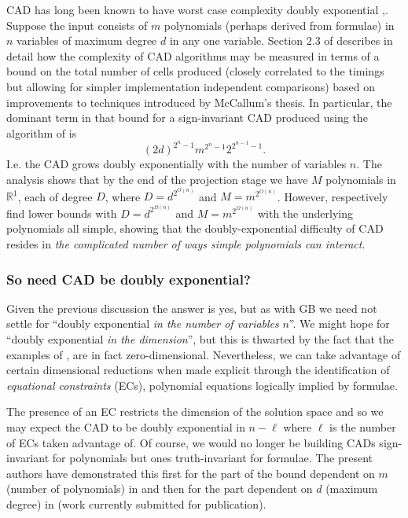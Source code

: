 \documentclass{llncs}
\begin{document}
CAD has long been known to have worst case complexity doubly exponential \cite{BD07},\cite{DH88}. Suppose the input consists of $m$ polynomials (perhaps derived from formulae) in $n$ variables of maximum degree $d$ in any one variable.  Section 2.3 of \cite{BDEMW16} describes in detail how the complexity of CAD algorithms may be measured in terms of a bound on the total number of cells produced (closely correlated to the timings but allowing for simpler implementation independent comparisons) based on improvements to techniques introduced by McCallum's thesis.  In particular, the dominant term in that bound for a sign-invariant CAD produced using the algorithm of \cite{McCallum1998} is
\begin{equation}
\label{eq:BoundSI}
(2d)^{2^{n}-1}m^{2^{n}-1}2^{2^{n-1}-1}.
\end{equation}
I.e. the CAD grows doubly exponentially with the number of variables $n$.
The analysis shows that by the end of the projection stage we have $M$ polynomials in $\mathbb{R}^1$, each of degree $D$, where $D=d^{2^{O(n)}}$ and $M=m^{2^{O(n)}}$. 
However, \cite{DH88} \cite{BD07} respectively find lower bounds with $D=d^{2^{\Omega(n)}}$ and $M=m^{2^{\Omega(n)}}$ with the underlying polynomials all simple, showing that the doubly-exponential difficulty of CAD resides in \emph{the complicated number of ways simple polynomials can interact}. 

\subsubsection*{So need CAD be doubly exponential?}  Given the previous discussion the answer is yes, but as with GB we need not settle for ``doubly exponential \emph{in the number of variables} $n$''.  We might hope for ``doubly exponential \emph{in the dimension}'', but this is thwarted by the fact that the examples of  \cite{BD07},\cite{DH88} are in fact zero-dimensional.  Nevertheless, we can take advantage of certain dimensional reductions when made explicit through the identification of \emph{equational constraints} (ECs), polynomial equations logically implied by formulae.

The presence of an EC restricts the dimension of the solution space and so we may expect the CAD to be doubly exponential in $n-\ell$ where $\ell$ is the number of ECs taken advantage of.  
Of course, we would no longer be building CADs sign-invariant for polynomials but ones truth-invariant for formulae.   The present authors have demonstrated this first for the part of the bound dependent on $m$ (number of polynomials) in \cite{EBD15} and then for the part dependent on $d$ (maximum degree) in \cite{ED16} (work currently submitted for publication).
\end{document}
